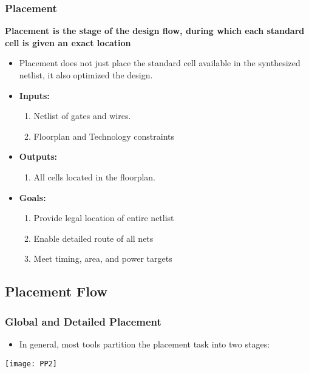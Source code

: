 \documentclass[compress]{beamer}
\begin{document}
\begin{frame}
	\frametitle{Placement}
	\textbf{Placement is the stage of the design flow, during which each standard cell is given an exact location}
	\pause
	\begin{itemize}
		\item Placement does not just place the standard cell available in the synthesized netlist, it also optimized the design.
		\pause
		\item \textbf{Inputs:}
		\pause
			\begin{enumerate}
				\item Netlist of gates and wires.
				\item Floorplan and Technology constraints
			\end{enumerate}
		\item \textbf{Outputs:}
		\pause
			\begin{enumerate}
			\item All cells located in the floorplan.
		\end{enumerate}
		\item \textbf{Goals:}
		\pause
		\begin{enumerate}
			\item Provide legal location of entire netlist
			\item Enable detailed route of all nets
			\item Meet timing, area, and power targets
		\end{enumerate}
	\end{itemize}
\end{frame}
\subsection[Flow]{Placement Flow}
\begin{frame}
	\frametitle{Global and Detailed Placement}
	\begin{itemize}
		\item In general, most tools partition the placement task
		into two stages:
	\end{itemize}
	\begin{center}
		\texttt{[image: PP2]}
	\end{center}
\end{frame}
\end{document}
